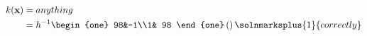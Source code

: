 \begin{align*}k(\mathbf{x}) & =anything                                                 \\
                            & =h^{-1}\begin{one}
	                                     98&-1\\1& 98
                                     \end{one}\left(\right)\solnmarksplus{1}{correctly} \\
\end{align*}
